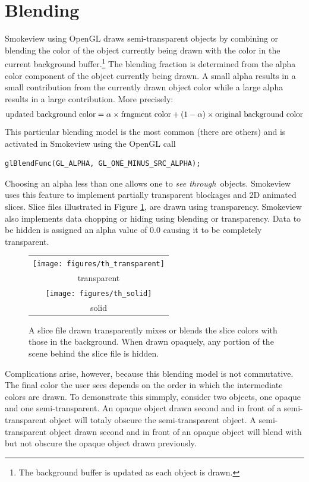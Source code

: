 \documentclass[11pt,twoside]{book}
\begin{document}
\section{Blending}
\label{blending}
Smokeview using OpenGL draws semi-transparent objects by combining or blending the color of the object currently being drawn with the color in the current background buffer.\footnote{The background buffer is updated as each object is drawn.}
The blending fraction is determined from the alpha color component of the object currently being drawn.
A small alpha results in a small contribution from the currently drawn object color while a large alpha results in a large contribution.  More precisely:
\begin{eqnarray*}
\noindent\mbox{updated background color} = \alpha\times \mbox{fragment color} + (1-\alpha)\times \mbox{original background color}
\end{eqnarray*}
This particular blending model is the most common (there are others) and is activated in Smokeview using the OpenGL call
\begin{verbatim}
glBlendFunc(GL_ALPHA, GL_ONE_MINUS_SRC_ALPHA);
\end{verbatim}

Choosing an alpha less than one allows one to
{\em see through}\ objects. Smokeview uses this feature to implement
partially transparent blockages and 2D animated slices.
Slice files illustrated in Figure
\ref{figtransparent}, are drawn using transparency. Smokeview also implements
data chopping or hiding using blending or transparency.  Data to be hidden is assigned an alpha
value of 0.0 causing it to be completely transparent.

\begin{figure}[t]
\begin{center}
\begin{tabular}{c}
\texttt{[image: figures/th\_transparent]}\\
transparent\\
\texttt{[image: figures/th\_solid]}\\
solid\\
\end{tabular}
\end{center}
\caption {A slice file drawn transparently mixes or blends the
slice colors with those in the background.  When drawn opaquely,
any portion of the scene behind the slice file is hidden. }
\label{figtransparent}
\end{figure}

Complications arise, however, because this blending model is not commutative.  The final color the user sees depends on the order in which the intermediate colors are drawn. To demonstrate this simmply, consider two objects, one opaque and one semi-transparent.  An opaque object drawn second and in front of a semi-transparent object will totaly obscure the semi-transparent object. A semi-transparent object drawn second and in front of an opaque object will blend with but not obscure the opaque object drawn previously.
\end{document}
